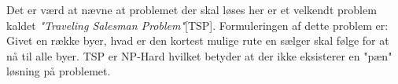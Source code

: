 Det er værd at nævne at problemet der skal løses her er et velkendt problem kaldet \textit{"Traveling Salesman Problem"}[TSP]. Formuleringen af dette problem er: Givet en række byer, hvad er den kortest mulige rute en sælger skal følge for at nå til alle byer. TSP er NP-Hard hvilket betyder at der ikke eksisterer en "pæn" løsning på problemet. \\~\\